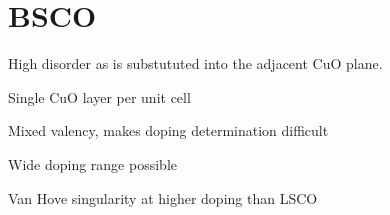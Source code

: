 
\section{\ac{BSCO}}

High disorder as is substututed into the adjacent CuO plane.

Single CuO layer per unit cell

Mixed valency, makes doping determination difficult

Wide doping range possible

Van Hove singularity at higher doping than LSCO


